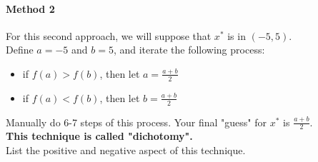 \documentclass[]{article}
\begin{document}
	\paragraph{Method 2}
	For this second approach, we will suppose that $x^*$ is in $(-5,5)$.\\
	Define $a=-5$ and $b=5$, and iterate the following process:
	\begin{itemize}
		\item if $f(a)>f(b)$, then let $a = \frac{a+b}{2}$
		\item if $f(a)<f(b)$, then let $b = \frac{a+b}{2}$
	\end{itemize}
	Manually do 6-7 steps of this process.
	Your final "guess" for $x^*$ is $\frac{a+b}{2}$.\\
	\textbf{This technique is called "dichotomy".}\\
	List the positive and negative aspect of this technique.
	
\end{document}
